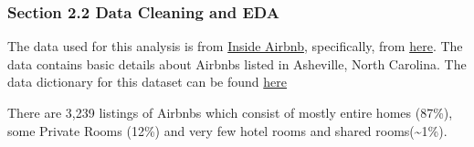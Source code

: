 \documentclass[
  letterpaper,
  DIV=11,
  numbers=noendperiod]{scrartcl}
\begin{document}
\hypertarget{section-2.2-data-cleaning-and-eda}{%
\subsubsection{Section 2.2 Data Cleaning and
EDA}\label{section-2.2-data-cleaning-and-eda}}

The data used for this analysis is from
\href{http://insideairbnb.com/get-the-data}{Inside Airbnb},
specifically, from
\href{https://anlane611.github.io/ids702-fall23/DAA/listings.csv}{here}.
The data contains basic details about Airbnbs listed in Asheville, North
Carolina. The data dictionary for this dataset can be found
\href{https://docs.google.com/spreadsheets/d/1iWCNJcSutYqpULSQHlNyGInUvHg2BoUGoNRIGa6Szc4/edit\#gid=1322284596}{here}

There are 3,239 listings of Airbnbs which consist of mostly entire homes
(87\%), some Private Rooms (12\%) and very few hotel rooms and shared
rooms(\textasciitilde1\%).
\end{document}
